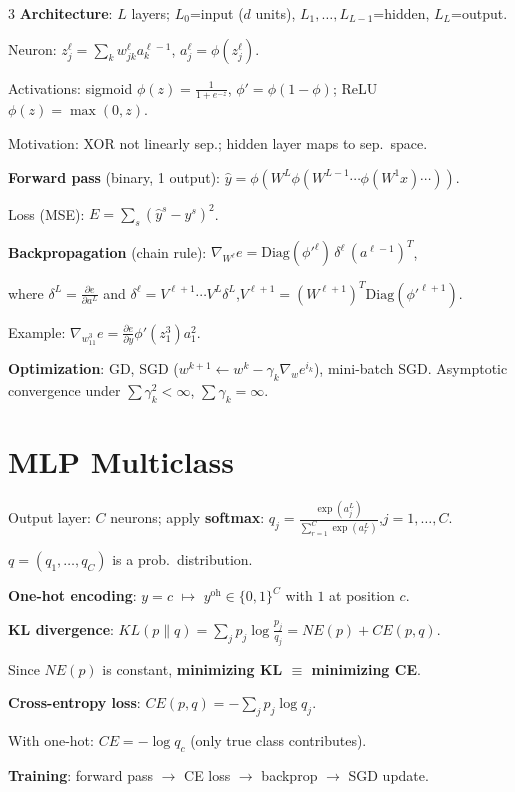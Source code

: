 \documentclass[8pt,fleqn]{extarticle}
\begin{document}
\begin{multicols}{3}
\textbf{Architecture}: $L$ layers; $L_0$=input ($d$ units), $L_1,\ldots,L_{L-1}$=hidden, $L_L$=output.

Neuron: $z_j^\ell=\sum_k w_{jk}^\ell a_k^{\ell-1}$, $a_j^\ell=\phi(z_j^\ell)$.

Activations: sigmoid $\phi(z)=\tfrac{1}{1+e^{-z}}$, $\phi'=\phi(1-\phi)$; ReLU $\phi(z)=\max(0,z)$.

Motivation: XOR not linearly sep.; hidden layer maps to sep.\ space.

\textbf{Forward pass} (binary, 1 output):
$\hat y=\phi(W^L\phi(W^{L-1}\cdots\phi(W^1 x)\cdots))$.

Loss (MSE): $E=\sum_s({\hat y}^s-y^s)^2$.

\textbf{Backpropagation} (chain rule):
$\nabla_{W^\ell}e=\text{Diag}(\phi'^\ell)\,\delta^\ell\,(a^{\ell-1})^T$,

where $\delta^L=\frac{\partial e}{\partial a^L}$ and $\delta^\ell=V^{\ell+1}\cdots V^L\delta^L$,\quad $V^{\ell+1}=(W^{\ell+1})^T\text{Diag}(\phi'^{\ell+1})$.

Example: $\nabla_{w_{11}^3}e=\frac{\partial e}{\partial y}\phi'(z_1^3)a_1^2$.

\textbf{Optimization}: GD, SGD ($w^{k+1}\leftarrow w^k-\gamma_k\nabla_w e^{i_k}$), mini-batch SGD. Asymptotic convergence under $\sum\gamma_k^2<\infty$, $\sum\gamma_k=\infty$.


\section*{MLP Multiclass}

Output layer: $C$ neurons; apply \textbf{softmax}:
$q_j=\frac{\exp(a_j^L)}{\sum_{r=1}^C\exp(a_r^L)}$,\quad $j=1,\ldots,C$.

$q=(q_1,\ldots,q_C)$ is a prob.\ distribution.

\textbf{One-hot encoding}: $y=c$ $\mapsto$ $y^{\text{oh}}\in\{0,1\}^C$ with $1$ at position $c$.

\textbf{KL divergence}: $KL(p\|q)=\sum_j p_j\log\frac{p_j}{q_j}=NE(p)+CE(p,q)$.

Since $NE(p)$ is constant, \textbf{minimizing KL $\equiv$ minimizing CE}.

\textbf{Cross-entropy loss}: $CE(p,q)=-\sum_j p_j\log q_j$.

With one-hot: $CE=-\log q_c$ (only true class contributes).

\textbf{Training}: forward pass $\to$ CE loss $\to$ backprop $\to$ SGD update.


\end{multicols}
\end{document}
